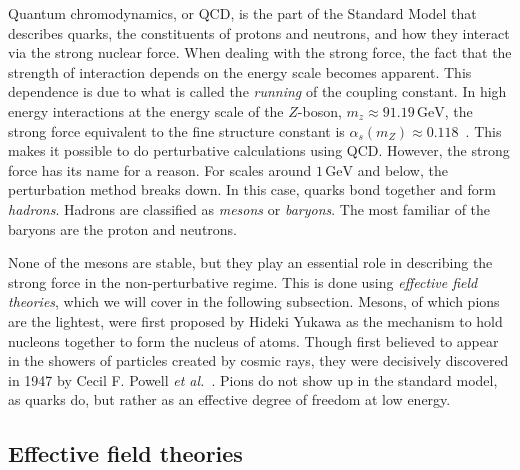 Quantum chromodynamics, or QCD, is the part of the Standard Model that describes quarks, the constituents of protons and neutrons, and how they interact via the strong nuclear force.
When dealing with the strong force, the fact that the strength of interaction depends on the energy scale becomes apparent.
This dependence is due to what is called the \emph{running} of the coupling constant.
In high energy interactions at the energy scale of the $Z$-boson, $m_z \approx 91.19 \, \text{GeV}$, the strong force equivalent to the fine structure constant is $\alpha_s(m_Z) \approx 0.118$~\cite{PDG}.
This makes it possible to do perturbative calculations using QCD.
However, the strong force has its name for a reason.
For scales around $1\, \text{GeV}$ and below, the perturbation method breaks down.
In this case, quarks bond together and form \emph{hadrons}.
Hadrons are classified as \emph{mesons} or \emph{baryons}.
The most familiar of the baryons are the proton and neutrons.

None of the mesons are stable, but they play an essential role in describing the strong force in the non-perturbative regime.
This is done using \emph{effective field theories}, which we will cover in the following subsection.
Mesons, of which pions are the lightest, were first proposed by Hideki Yukawa as the mechanism to hold nucleons together to form the nucleus of atoms.
Though first believed to appear in the showers of particles created by cosmic rays, they were decisively discovered in 1947 by Cecil F. Powell \emph{et al.}~\cite{griffiths:introduction}.
Pions do not show up in the standard model, as quarks do, but rather as an effective degree of freedom at low energy.


\subsection*{Effective field theories}

